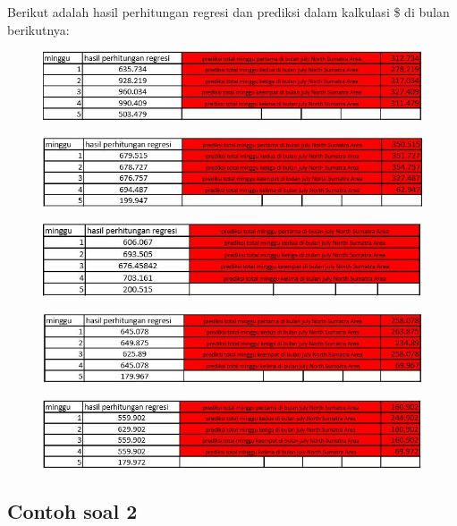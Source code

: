  \par Berikut adalah hasil perhitungan regresi dan prediksi dalam kalkulasi \$ di bulan berikutnya:
\begin{figure}[!htbp]
    \centering
    \includegraphics[scale=0.7]{chapters/figures/11.JPG}
\end{figure}
\begin{figure}[!htbp]
    \centering
    \includegraphics[scale=0.7]{chapters/figures/22.JPG}
\end{figure}
\begin{figure}[!htbp]
    \centering
    \includegraphics[scale=0.7]{chapters/figures/33.JPG}
\end{figure}
\begin{figure}[!htbp]
    \centering
    \includegraphics[scale=0.7]{chapters/figures/44.JPG}
\end{figure}
\begin{figure}[!htbp]
    \centering
    \includegraphics[scale=0.7]{chapters/figures/55.JPG}
\end{figure}
\newpage  \subsection{Contoh soal 2}
